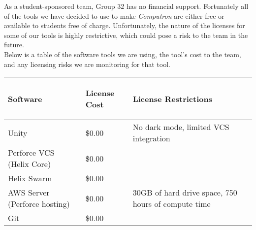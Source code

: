 As a student-sponsored team, Group 32 has no financial support. Fortunately all of 
the tools we have decided to use to make \textit{Computron} are either free or available 
to students free of charge. Unfortunately, the nature of the licenses for some of our 
tools is highly restrictive, which could pose a risk to the team in the future.\\

Below is a table of the software tools we are using, the tool's cost to the team, and
 any licensing risks we are monitoring for that tool. 
\begin{center}
    \begin{tabular}{ | m{5cm} | m{4cm} | m{5cm} |} 
        \hline
            \begin{center}
                \textbf{Software}
            \end{center} & 
            \begin{center}
                \textbf{License Cost}
            \end{center} & 
            \begin{center}
                \textbf{License Restrictions}
            \end{center}\\
        \hline
            Unity & 
            \$0.00 & 
            No dark mode, limited VCS integration\\
        \hline
            Perforce VCS (Helix Core) & 
            \$0.00 & 
            \\
        \hline
            Helix Swarm & 
            \$0.00 & 
            \\
        \hline
            AWS Server (Perforce hosting) & 
            \$0.00 & 
            30GB of hard drive space, 750 hours of compute time\\
        \hline
            Git & 
            \$0.00 & 
            \\
        \hline
    \end{tabular}
\end{center}